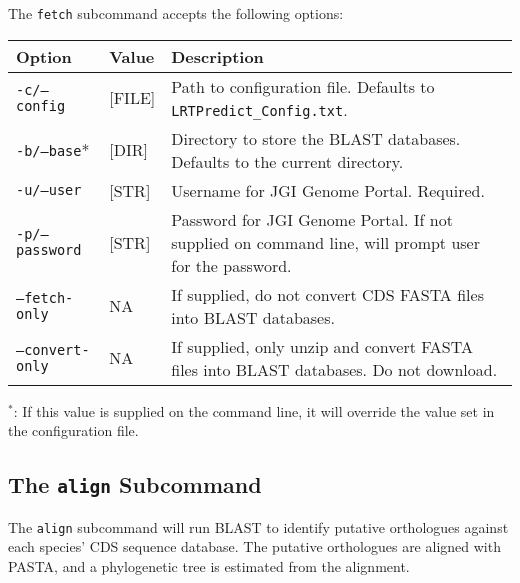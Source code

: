 \documentclass[12pt]{article}
\begin{document}
\par The \texttt{fetch} subcommand accepts the following options:
\begin{table}[H]
    \centering
    \begin{tabular}{p{105pt} l p{260pt}}
    \toprule
    Option & Value & Description \\
    \midrule
    \texttt{-c/--config} & [FILE] & Path to configuration file. Defaults to \texttt{LRTPredict\_Config.txt}. \\
    \midrule
    \texttt{-b/--base}* & [DIR] & Directory to store the BLAST databases. Defaults to the current directory.\\
    \midrule
    \texttt{-u/--user} & [STR] & Username for JGI Genome Portal. Required.\\
    \midrule
    \texttt{-p/--password} & [STR] & Password for JGI Genome Portal. If not supplied on command line, will prompt user for the password.\\
    \midrule
    \texttt{--fetch-only} & NA & If supplied, do not convert CDS FASTA files into BLAST databases.\\
    \midrule
    \texttt{--convert-only} & NA & If supplied, only unzip and convert FASTA files into BLAST databases. Do not download.\\
    \bottomrule
    \end{tabular}
\end{table}
\par $^*$: If this value is supplied on the command line, it will override
the value set in the configuration file.

\subsection*{The \texttt{align} Subcommand}
\par The \texttt{align} subcommand will run BLAST to identify putative
orthologues against each species' CDS sequence database. The putative
orthologues are aligned with PASTA, and a phylogenetic tree is estimated from
the alignment.
\end{document}
